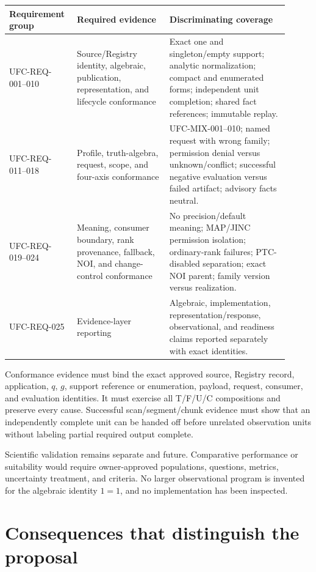 \begin{longtable}{p{0.20\linewidth}p{0.31\linewidth}p{0.40\linewidth}}
\toprule
Requirement group & Required evidence & Discriminating coverage\\
\midrule
\endhead
UFC-REQ-001--010 & Source/Registry identity, algebraic, publication,
representation, and lifecycle conformance & Exact one and singleton/empty
support; analytic normalization; compact and enumerated forms; independent
unit completion; shared fact references; immutable replay.\\
UFC-REQ-011--018 & Profile, truth-algebra, request, scope, and four-axis
conformance & UFC-MIX-001--010; named request with wrong family; permission
denial versus unknown/conflict; successful negative evaluation versus failed
artifact; advisory facts neutral.\\
UFC-REQ-019--024 & Meaning, consumer boundary, rank provenance, fallback, NOI,
and change-control conformance & No precision/default meaning; MAP/JINC
permission isolation; ordinary-rank failures; PTC-disabled separation; exact
NOI parent; family version versus realization.\\
UFC-REQ-025 & Evidence-layer reporting & Algebraic, implementation,
representation/response, observational, and readiness claims reported
separately with exact identities.\\
\bottomrule
\end{longtable}

Conformance evidence must bind the exact approved source, Registry record,
application, \(q\), \(g\), support reference or enumeration, payload, request,
consumer, and evaluation identities. It must exercise all T/F/U/C
compositions and preserve every cause. Successful scan/segment/chunk evidence
must show that an independently complete unit can be handed off before
unrelated observation units without labeling partial required output complete.

Scientific validation remains separate and future. Comparative performance or
suitability would require owner-approved populations, questions, metrics,
uncertainty treatment, and criteria. No larger observational program is
invented for the algebraic identity \(1=1\), and no implementation has been
inspected.

\else

\section{Consequences that distinguish the proposal}

